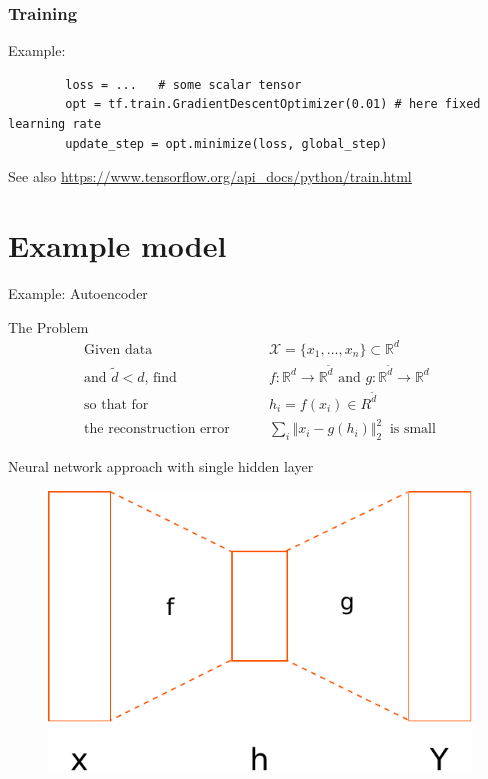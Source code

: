 \documentclass[mathserif]{beamer}
\begin{document}
\begin{frame}[fragile]
	\frametitle{Training}
	Example:
	\begin{verbatim}
		loss = ...   # some scalar tensor
		opt = tf.train.GradientDescentOptimizer(0.01) # here fixed learning rate
		update_step = opt.minimize(loss, global_step)
	\end{verbatim}
	
	See also \url{https://www.tensorflow.org/api_docs/python/train.html}
\end{frame}

\section{Example model}

\begin{frame}{Example: Autoencoder}
	\begin{block}{The Problem}
		\vspace{-0.3cm}
		\begin{align*}
			\text{Given data}&\qquad\mathcal X = \lbrace x_1,\dots,x_n\rbrace\subset\mathbb R^d\\
			\text{and $\tilde d < d$, find}&\qquad f:\mathbb R^d\rightarrow\mathbb R^{\tilde d} \text{\ and\ } g:\mathbb R^{\tilde d}\rightarrow\mathbb R^d\\
			\text{so that for}&\qquad h_i=f(x_i)\in{R}^{\tilde d}\\
			\text{the reconstruction error}&\qquad\sum_i\Vert x_i -g(h_i)\Vert_2^2\  \text{\ is small}
		\end{align*}
	\end{block}
	\vspace{-0.5cm}
	\begin{block}{Neural network approach with single hidden layer}
		\begin{figure}
			\centering\includegraphics[scale=0.4]{autoencoder.pdf}

\end{figure}
\end{block}
\end{frame}
\end{document}
